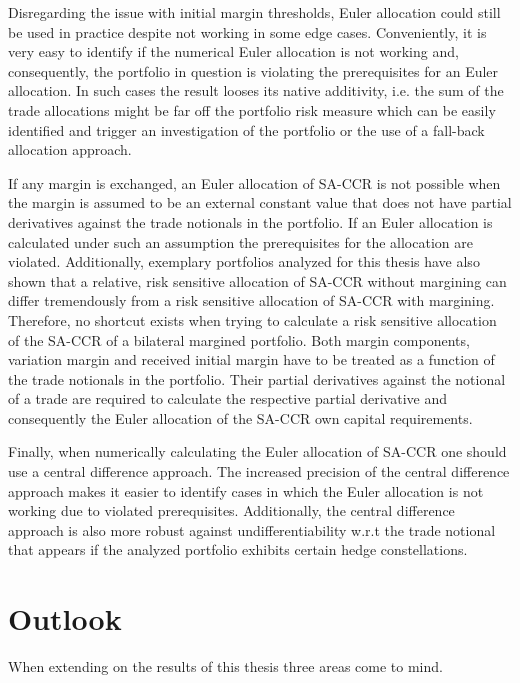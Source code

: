 \documentclass[../Thesis_AHoecherl.tex]{subfiles}
\begin{document}
Disregarding the issue with initial margin thresholds, Euler allocation could still be used in practice despite not working in some edge cases. 
Conveniently, it is very easy to identify if the numerical Euler allocation is not working and, consequently, the portfolio in question is violating the prerequisites for an Euler allocation.
In such cases the result looses its native additivity, i.e. the sum of the trade allocations might be far off the portfolio risk measure which can be easily identified and trigger an investigation of the portfolio or the use of a fall-back allocation approach.

If any margin is exchanged, an Euler allocation of \gls{SA-CCR} is not possible when the margin is assumed to be an external constant value that does not have partial derivatives against the trade notionals in the portfolio.
If an Euler allocation is calculated under such an assumption the prerequisites for the allocation are violated. Additionally, exemplary portfolios analyzed for this thesis have also shown that a relative, risk sensitive allocation of \gls{SA-CCR} without margining can differ tremendously from a risk sensitive allocation of \gls{SA-CCR} with margining.
Therefore, no shortcut exists when trying to calculate a risk sensitive allocation of the \gls{SA-CCR} of a bilateral margined portfolio. 
Both margin components, variation margin and received initial margin have to be treated as a function of the trade notionals in the portfolio. Their partial derivatives against the notional of a trade are required to calculate the respective partial derivative and consequently the Euler allocation of the \gls{SA-CCR} own capital requirements.

Finally, when numerically calculating the Euler allocation of \gls{SA-CCR} one should use a central difference approach. The increased precision of the central difference approach makes it easier to identify cases in which the Euler allocation is not working due to violated prerequisites. Additionally, the central difference approach is also more robust against undifferentiability w.r.t the trade notional that appears if the analyzed portfolio exhibits certain hedge constellations.

\section{Outlook\label{sec:Outlook}}

When extending on the results of this thesis three areas come to mind.
\end{document}
